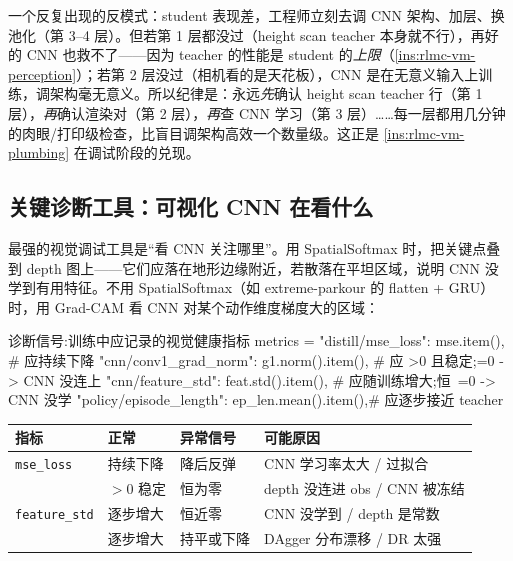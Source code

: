 \begin{insight}[跳过前层直接查后层是视觉调试最大的时间浪费]\label{ins:rlmc-vm-fivelayer}
一个反复出现的反模式：student 表现差，工程师立刻去调 CNN 架构、加层、换池化（第 3--4 层）。但若第 1 层都没过（height scan teacher 本身就不行），再好的 CNN 也救不了——因为 teacher 的性能是 student 的\emph{上限}（\cref{ins:rlmc-vm-perception}）；若第 2 层没过（相机看的是天花板），CNN 是在无意义输入上训练，调架构毫无意义。所以纪律是：永远\emph{先}确认 height scan teacher 行（第 1 层），\emph{再}确认渲染对（第 2 层），\emph{再}查 CNN 学习（第 3 层）……每一层都用几分钟的肉眼/打印级检查，比盲目调架构高效一个数量级。这正是 \cref{ins:rlmc-vm-plumbing} 在调试阶段的兑现。
\end{insight}

\subsection{关键诊断工具：可视化 CNN 在看什么}
\label{sec:rlmc-vm-vizcnn}

最强的视觉调试工具是“看 CNN 关注哪里”。用 SpatialSoftmax 时，把关键点叠到 depth 图上——它们应落在地形边缘附近，若散落在平坦区域，说明 CNN 没学到有用特征。不用 SpatialSoftmax（如 extreme-parkour 的 flatten + GRU）时，用 Grad-CAM 看 CNN 对某个动作维度梯度大的区域：

\begin{codebox}[Python]{诊断信号:训练中应记录的视觉健康指标}
metrics = {
    "distill/mse_loss":      mse.item(),          # 应持续下降
    "cnn/conv1_grad_norm":   g1.norm().item(),    # 应 >0 且稳定;=0 -> CNN 没连上
    "cnn/feature_std":       feat.std().item(),   # 应随训练增大;恒~=0 -> CNN 没学
    "policy/episode_length": ep_len.mean().item(),# 应逐步接近 teacher
}
\end{codebox}

\begin{center}
\small
\begin{tabular}{@{}llll@{}}
\toprule
指标 & 正常 & 异常信号 & 可能原因 \\
\midrule
\verb|mse_loss| & 持续下降 & 降后反弹 & CNN 学习率太大 / 过拟合 \\
\Verb[breaklines]|conv1_grad_norm| & $>0$ 稳定 & 恒为零 & depth 没连进 obs / CNN 被冻结 \\
\verb|feature_std| & 逐步增大 & 恒近零 & CNN 没学到 / depth 是常数 \\
\Verb[breaklines]|episode_length| & 逐步增大 & 持平或下降 & DAgger 分布漂移 / DR 太强 \\
\bottomrule
\end{tabular}
\end{center}

